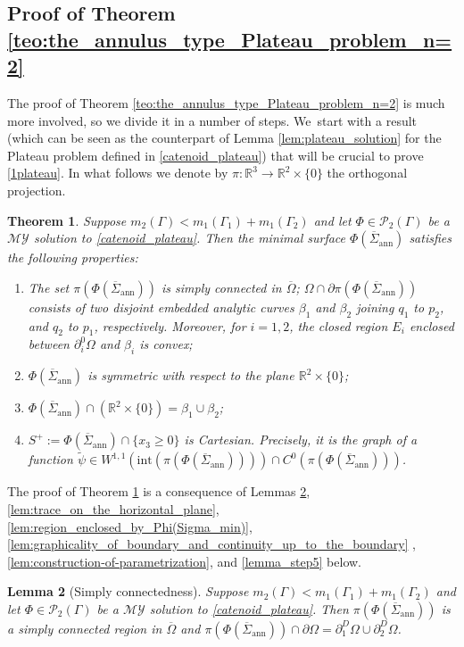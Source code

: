 \documentclass[11pt]{article}
\numberwithin{equation}{section}
\newcommand{\R}{\mathbb{R}}
\let\Om\Omega
\newcommand{\immclosedann}{\Phi({\overline\Sigma}_\mathrm{ann})}
\newtheorem{theorem}{Theorem}[section]
\newtheorem{lemma}[theorem]{Lemma}
\theoremstyle{definition}
\begin{document}
\subsection{Proof of Theorem \ref{teo:the_annulus_type_Plateau_problem_n=2}}
The proof of
Theorem \ref{teo:the_annulus_type_Plateau_problem_n=2}
is much more involved, so we divide it in a number of steps. We~start with a result (which can be seen as the counterpart of
Lemma \ref{lem:plateau_solution} for the Plateau problem defined in \eqref{catenoid_plateau}) that will be crucial to prove \ref{1plateau}.
In what follows we denote by $\pi\colon\R^3\to\R^2\times\{0\}$ the orthogonal projection.
\begin{theorem}\label{crucial_teo}
Suppose $m_2(\Gamma)<m_1(\Gamma_1)+m_1(\Gamma_2)$ and let
$\Phi\in\mathcal{P}_2(\Gamma)$ be a $\mathcal{MY}$ solution to \eqref{catenoid_plateau}.
Then the minimal surface $\immclosedann$ satisfies the following properties:
\begin{enumerate}[label=$(\arabic*)$,wide]
\item \label{crucial1} The set $\pi(\immclosedann)$
is simply connected in $\overline\Omega$; $\Om\cap\partial \pi(\immclosedann)$
consists of two disjoint embedded analytic curves $\beta_1$ and $\beta_2$ joining $q_1$ to $p_2$, and $q_2$ to $p_1$, respectively.
Moreover, for
$i=1,2$,
the closed region $E_i$
enclosed between $\partial_i^0\Om$ and $\beta_i$
is convex;
\item\label{crucial2} $\immclosedann$ is symmetric with respect to the plane $\R^2\times\{0\}$;
\item\label{crucial3} $\immclosedann\cap(\R^2\times\{0\})=\beta_1\cup\beta_2$;
\item\label{crucial4} $S^+:=\immclosedann\cap \{x_3\ge0\}$ is Cartesian. Precisely, it is
the graph of a function $\widetilde\psi\in W^{1,1}(\mathrm{int}(\pi(\immclosedann)))\cap C^0({\pi(\immclosedann)})$.
\end{enumerate}
\end{theorem}
The proof of Theorem \ref{crucial_teo} is a consequence of Lemmas \ref{lem:simply_connectedness}, \ref{lem:trace_on_the_horizontal_plane}, \ref{lem:region_enclosed_by_Phi(Sigma_min)}, \ref{lem:graphicality_of_boundary_and_continuity_up_to_the_boundary} , \ref{lem:construction-of-parametrization}, and \ref{lemma_step5} below.
\begin{lemma}[Simply connectedness]
\label{lem:simply_connectedness}
Suppose $m_2(\Gamma)<m_1(\Gamma_1)+m_1(\Gamma_2)$ and let
$\Phi\in\mathcal{P}_2(\Gamma)$ be a $\mathcal{MY}$ solution to \eqref{catenoid_plateau}.
Then $\pi(\immclosedann)$ is a simply connected region in $\overline\Omega$ and { $\pi(\immclosedann)\cap\partial\Om=\partial_1^D\Om\cup\partial_2^D\Om$}.
\end{lemma}
\end{document}

